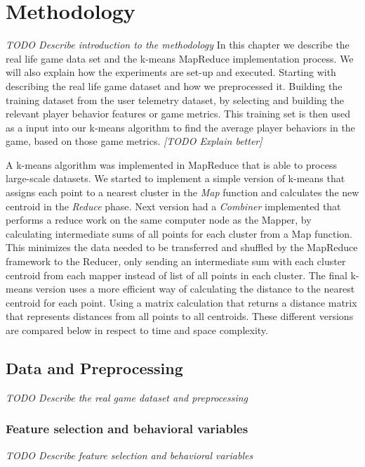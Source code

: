 
\chapter{Methodology} %
\label{Chapter4}
\textit{TODO Describe introduction to the methodology}
In this chapter we describe the real life game data set and the k-means MapReduce implementation process. We will also explain how the experiments are set-up and executed. Starting with describing the real life game dataset and how we preprocessed it. Building the training dataset from the user telemetry dataset, by selecting and building the relevant player behavior features or game metrics. This training set is then used as a input into our k-means algorithm to find the average player behaviors in the game, based on those game metrics. \textit{[TODO Explain better]}

A k-means algorithm was implemented in MapReduce that is able to process large-scale datasets. We started to implement a simple version of k-means that assigns each point to a nearest cluster in the \textit{Map} function and calculates the new centroid in the \textit{Reduce} phase. Next version had a \textit{Combiner} implemented that performs a reduce work on the same computer node as the Mapper, by calculating intermediate sums of all points for each cluster from a Map function. This minimizes the data needed to be transferred and shuffled by the MapReduce framework to the Reducer, only sending an intermediate sum with each cluster centroid from each mapper instead of list of all points in each cluster. The final k-means version uses a more efficient way of calculating the distance to the nearest centroid for each point. Using a matrix calculation that returns a distance matrix that represents distances from all points to all centroids. These different versions are compared below in respect to time and space complexity.


\section{Data and Preprocessing}
\textit{TODO Describe the real game dataset and preprocessing}

\lipsum[1-3]

\subsection{Feature selection and behavioral variables}
\textit{TODO Describe feature selection and behavioral variables}

